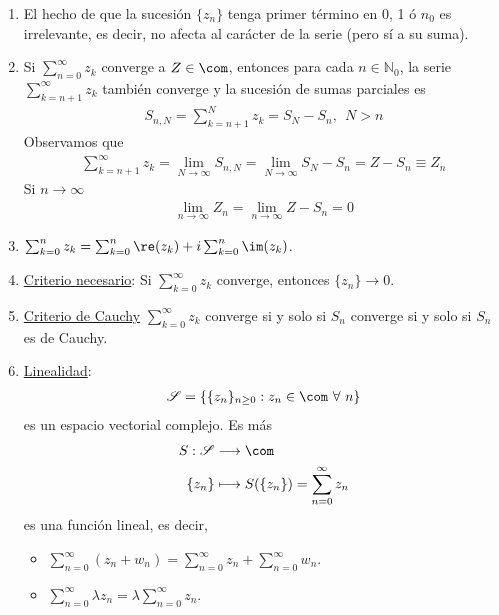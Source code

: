 \begin{obs}
\begin{enumerate}
    \item El hecho de que la sucesión $\{z_n\}$ tenga primer término en 0, 1 ó $n_0$ es irrelevante, es decir, no afecta al carácter de la serie (pero sí a su suma).
    \item Si $\sum_{n=0}^{\infty}{z_k}$ converge a $Z \in \com$, entonces para cada $n \in \mathbb{N}_0$, la serie $\sum_{k = n+1}^{\infty}{z_k}$ también converge y la sucesión de sumas parciales es
    \begin{align*}
        S_{n,N} = \sum_{k = n+1}^{N}{z_k} = S_N - S_n, \ \ N > n
    \end{align*}
    Observamos que
    \begin{align*}
        \sum_{k = n+1}^{\infty}{z_k} = \lim_{N \to \infty}{S_{n,N}} = \lim_{N \to \infty}{S_N - S_n} = Z - S_n \equiv Z_n
    \end{align*}
    Si $n \to \infty$
    \begin{align*}
        \lim_{n \to \infty}{Z_n} = \lim_{n \to \infty}{Z - S_n} = 0 
    \end{align*}
    \item $\sum_{k=0}^{n}{z_k} = \sum_{k=0}^{n}{\re(z_k)} + i\sum_{k=0}^{n}{\im(z_k)}$.
    \item \underline{Criterio necesario}: Si $\sum_{k=0}^{\infty}{z_k}$ converge, entonces $\{z_n\} \to 0$.
    \item \underline{Criterio de Cauchy} $\sum_{k=0}^{\infty}{z_k}$ converge si y solo si $S_n$ converge si y solo si $S_n$ es de Cauchy.
    \item \underline{Linealidad}:
    \begin{align*}
        \mathscr{S} = \{ \{z_n\}_{n \ge 0} : z_n \in \com \ \forall \ n \}
    \end{align*}
    es un espacio vectorial complejo. Es más
    \begin{align*}
        S : \mathscr{S} &\longrightarrow \com \\
        \{z_n\} &\longmapsto S(\{z_n\}) = \sum_{n=0}^{\infty}{z_n}
    \end{align*}
    es una función lineal, es decir,
    \begin{itemize}
        \item $\sum_{n=0}^{\infty}{(z_n + w_n)} = \sum_{n=0}^{\infty}{z_n} + \sum_{n=0}^{\infty}{w_n}$.
        \item $\sum_{n=0}^{\infty}{\lambda z_n} = \lambda \sum_{n=0}^{\infty}{z_n}$.
    \end{itemize}
\end{enumerate}
\end{obs}

